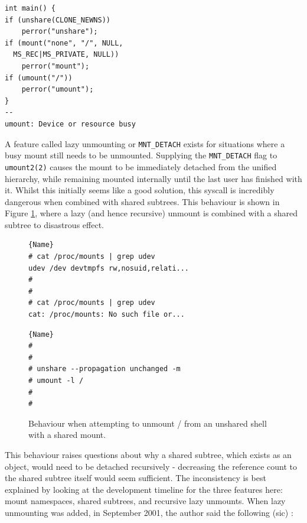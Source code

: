 \documentclass[sigplan]{acmart}
\begin{document}
\begin{lstlisting}[float,label={lst:unshare-umount}]
int main() {
if (unshare(CLONE_NEWNS))
	perror("unshare");
if (mount("none", "/", NULL,
  MS_REC|MS_PRIVATE, NULL))
	perror("mount");
if (umount("/"))
	perror("umount");
}
--
umount: Device or resource busy
\end{lstlisting}

A feature called lazy unmounting or \texttt{MNT\_DETACH} exists for situations where a busy mount still needs to be unmounted. Supplying the \texttt{MNT\_DETACH} flag to \texttt{umount2(2)} causes the mount to be immediately detached from the unified hierarchy, while remaining mounted internally until the last user has finished with it. Whilst this initially seems like a good solution, this syscall is incredibly dangerous when combined with shared subtrees. This behaviour is shown in Figure \ref{fig:unshare-umount-lazy}, where a lazy (and hence recursive) unmount is combined with a shared subtree to disastrous effect.

\begin{figure}
\begin{minipage}{.45\textwidth}

\begin{lstlisting}[frame=tlrb,showlines=true]{Name}
# cat /proc/mounts | grep udev
udev /dev devtmpfs rw,nosuid,relati...
#
#
# cat /proc/mounts | grep udev
cat: /proc/mounts: No such file or...
\end{lstlisting}
\end{minipage}\hfill
\begin{minipage}{.45\textwidth}

\begin{lstlisting}[frame=tlrb]{Name}
#
#
# unshare --propagation unchanged -m
# umount -l /
#
#
\end{lstlisting}

\end{minipage}

\caption{Behaviour when attempting to unmount / from an unshared shell with a shared mount.}
\label{fig:unshare-umount-lazy}
\end{figure}

This behaviour raises questions about why a shared subtree, which exists as an object, would need to be detached recursively - decreasing the reference count to the shared subtree itself would seem sufficient. The inconsistency is best explained by looking at the development timeline for the three features here: mount namespaces, shared subtrees, and recursive lazy unmounts. When lazy unmounting was added, in September 2001, the author said the following (sic) \citep{viro_patch_2001}:
\end{document}
